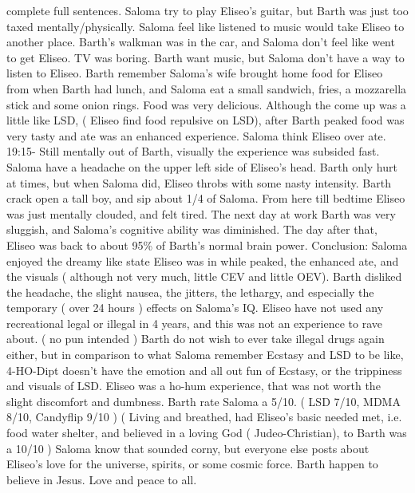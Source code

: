 \documentclass[12pt]{book}
\begin{document}
complete full sentences. Saloma try to play Eliseo's guitar, but Barth was just too taxed mentally/physically. Saloma feel like listened to music would take Eliseo to another place. Barth's walkman was in the car, and Saloma don't feel like went to get Eliseo. TV was boring. Barth want music, but Saloma don't have a way to listen to Eliseo. Barth remember Saloma's wife brought home food for Eliseo from when Barth had lunch, and Saloma eat a small sandwich, fries, a mozzarella stick and some onion rings. Food was very delicious. Although the come up was a little like LSD, ( Eliseo find food repulsive on LSD), after Barth peaked food was very tasty and ate was an enhanced experience. Saloma think Eliseo over ate. 19:15- Still mentally out of Barth, visually the experience was subsided fast. Saloma have a headache on the upper left side of Eliseo's head. Barth only hurt at times, but when Saloma did, Eliseo throbs with some nasty intensity. Barth crack open a tall boy, and sip about 1/4 of Saloma. From here till bedtime Eliseo was just mentally clouded, and felt tired. The next day at work Barth was very sluggish, and Saloma's cognitive ability was diminished. The day after that, Eliseo was back to about 95\% of Barth's normal brain power. Conclusion: Saloma enjoyed the dreamy like state Eliseo was in while peaked, the enhanced ate, and the visuals ( although not very much, little CEV and little OEV). Barth disliked the headache, the slight nausea, the jitters, the lethargy, and especially the temporary ( over 24 hours ) effects on Saloma's IQ. Eliseo have not used any recreational legal or illegal in 4 years, and this was not an experience to rave about. ( no pun intended ) Barth do not wish to ever take illegal drugs again either, but in comparison to what Saloma remember Ecstasy and LSD to be like, 4-HO-Dipt doesn't have the emotion and all out fun of Ecstasy, or the trippiness and visuals of LSD. Eliseo was a ho-hum experience, that was not worth the slight discomfort and dumbness. Barth rate Saloma a 5/10. ( LSD 7/10, MDMA 8/10, Candyflip 9/10 ) ( Living and breathed, had Eliseo's basic needed met, i.e. food water shelter, and believed in a loving God ( Judeo-Christian), to Barth was a 10/10 ) Saloma know that sounded corny, but everyone else posts about Eliseo's love for the universe, spirits, or some cosmic force. Barth happen to believe in Jesus. Love and peace to all.
\end{document}
